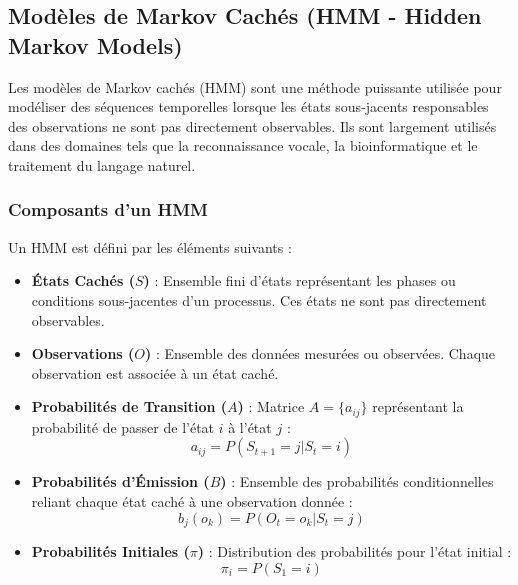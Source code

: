 \documentclass[a4paper,12pt,oneside]{report}	%
\begin{document}
        \subsection{Modèles de Markov Cachés (HMM - Hidden Markov Models)}
            Les modèles de Markov cachés (HMM) sont une méthode puissante utilisée pour modéliser des séquences temporelles lorsque les états sous-jacents responsables des observations ne sont pas directement observables. Ils sont largement utilisés dans des domaines tels que la reconnaissance vocale, la bioinformatique et le traitement du langage naturel.
            \subsubsection{Composants d’un HMM}
                Un HMM est défini par les éléments suivants :
                \begin{itemize}
                    \item \textbf{États Cachés ($S$)} : Ensemble fini d’états représentant les phases ou conditions sous-jacentes d’un processus. Ces états ne sont pas directement observables.
                    \item \textbf{Observations ($O$)} : Ensemble des données mesurées ou observées. Chaque observation est associée à un état caché.
                    \item \textbf{Probabilités de Transition ($A$)} : Matrice $A = \{a_{ij}\}$ représentant la probabilité de passer de l’état $i$ à l’état $j$ : \[a_{ij} = P(S_{t+1} = j | S_t = i)\]
                    \item \textbf{Probabilités d’Émission ($B$)} : Ensemble des probabilités conditionnelles reliant chaque état caché à une observation donnée : \[b_j(o_k) = P(O_t = o_k | S_t = j)\]
                    \item \textbf{Probabilités Initiales ($\pi$)} : Distribution des probabilités pour l’état initial : \[\pi_i = P(S_1 = i)\]
                \end{itemize}
\end{document}
